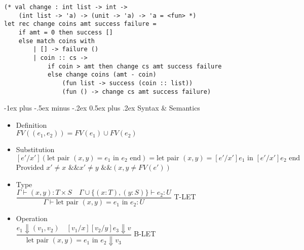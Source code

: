 \documentclass[12pt]{article}
\makeatletter
\renewcommand{\section}{\@startsection{section}{1}{0mm}%
                                    {-1ex plus -.5ex minus -.2ex}%
                                    {0.5ex plus .2ex}%
                                    {\normalfont\large\bfseries\color{header}}}
\makeatother
\begin{document}
\begin{multicols}{2}
\begin{lstlisting}
(* val change : int list -> int -> 
    (int list -> 'a) -> (unit -> 'a) -> 'a = <fun> *)
let rec change coins amt success failure = 
    if amt = 0 then success []
    else match coins with
        | [] -> failure ()
        | coin :: cs -> 
            if coin > amt then change cs amt success failure
            else change coins (amt - coin)
                (fun list -> success (coin :: list))
                (fun () -> change cs amt success failure)
\end{lstlisting}

\section{Syntax \& Semantics}

\begin{itemize}[noitemsep, nosep]
    \item Definition \\
    $FV((e_1, e_2)) = FV(e_1) \cup FV(e_2)$
    \item Substitution \\
    $[e'/x'](\text{let pair } (x, y) = e_1 \text{ in } e_2 \text{ end}) = \text{let pair } (x, y) = [e'/x']e_1 \text{ in } [e'/x']e_2 \text{ end}$ \\
    Provided $x' \ne x \text{ \&\& } x' \ne y \text{ \&\& } (x, y \ne FV(e'))$
    \item Type \\
    $\dfrac{\Gamma \vdash (x, y): T \times S \quad \Gamma \cup \{(x: T), (y: S)\} \vdash e_2: U}{\Gamma \vdash \text{let pair } (x, y) = e_1 \text{ in } e_2: U}$ T-LET
    \item Operation \\
    $\dfrac{e_1 \Downarrow (v_1, v_2) \quad [v_1/x][v_2/y]e_3 \Downarrow v}{\text{let pair } (x, y) = e_1 \text{ in } e_2 \Downarrow v_3}$ B-LET
\end{itemize}



\end{multicols}
\end{document}

